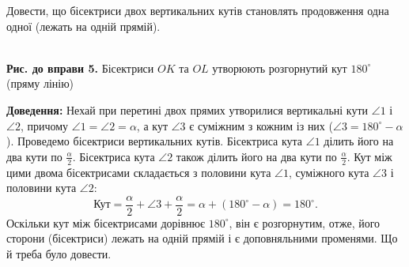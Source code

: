 \vspace{0.4cm}

\begin{problem}
Довести, що бісектриси двох вертикальних кутів становлять продовження одна одної (лежать на одній прямій).
\end{problem}

\begin{center}
\\[4pt]
{\small\textbf{Рис. до вправи 5.} Бісектриси $OK$ та $OL$ утворюють розгорнутий кут $180^\circ$ (пряму лінію)}
\end{center}

\textbf{Доведення:}
Нехай при перетині двох прямих утворилися вертикальні кути $\angle 1$ і $\angle 2$, причому $\angle 1 = \angle 2 = \alpha$, а кут $\angle 3$ є суміжним з кожним із них ($\angle 3 = 180^\circ - \alpha$).
Проведемо бісектриси вертикальних кутів. Бісектриса кута $\angle 1$ ділить його на два кути по $\frac{\alpha}{2}$. Бісектриса кута $\angle 2$ також ділить його на два кути по $\frac{\alpha}{2}$.
Кут між цими двома бісектрисами складається з половини кута $\angle 1$, суміжного кута $\angle 3$ і половини кута $\angle 2$:
\[
\text{Кут} = \frac{\alpha}{2} + \angle 3 + \frac{\alpha}{2} = \alpha + (180^\circ - \alpha) = 180^\circ.
\]
Оскільки кут між бісектрисами дорівнює $180^\circ$, він є розгорнутим, отже, його сторони (бісектриси) лежать на одній прямій і є доповняльними променями. Що й треба було довести.


